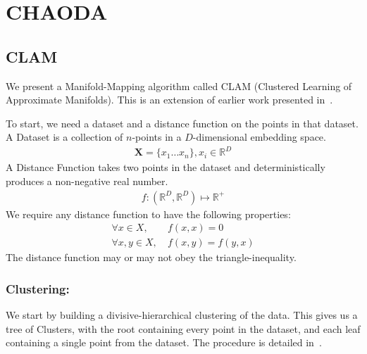 \section{CHAODA}
\label{sec:chaoda}

\subsection{CLAM}
\label{subsec:chaoda:manifold}

We present a Manifold-Mapping algorithm called CLAM (Clustered Learning of Approximate Manifolds).
This is an extension of earlier work presented in~\cite{ishaq2019entropy}.

To start, we need a dataset and a distance function on the points in that dataset.
A Dataset is a collection of $n$-points in a $D$-dimensional embedding space.
\begin{gather*}
    \textbf{X} = \{x_1 \dots x_n\}, x_i \in \mathbb{R}^D
\end{gather*}
A Distance Function takes two points in the dataset and deterministically produces a non-negative real number.
\begin{gather*}
    f : (\mathbb{R}^D, \mathbb{R}^D) \mapsto \mathbb{R}^+
\end{gather*}
We require any distance function to have the following properties:
\begin{align*}
    \forall x \in X, & \ f(x, x) = 0 \\
    \forall x, y \in X, & \ f(x, y) = f(y, x)
\end{align*}
The distance function may or may not obey the triangle-inequality.

\subsubsection*{Clustering:}
We start by building a divisive-hierarchical clustering of the data.
This gives us a tree of Clusters, with the root containing every point in the dataset, and each leaf containing a single point from the dataset.
The procedure is detailed in~\cite{ishaq2019entropy}.

